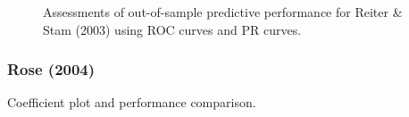 \begin{figure}
	\centering   
	\caption{Assessments of out-of-sample predictive performance for Reiter \& Stam (2003) using ROC curves and PR curves.}
\end{figure}
\FloatBarrier

\clearpage
\subsubsection*{Rose (2004)}

Coefficient plot and performance comparison.


\FloatBarrier

\FloatBarrier


